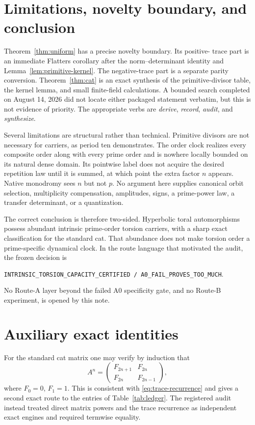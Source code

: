 \documentclass[11pt]{article}
\theoremstyle{definition}
\theoremstyle{remark}
\newcommand{\classification}{\texttt{INTRINSIC\_TORSION\_CAPACITY\_CERTIFIED / A0\_FAIL\_PROVES\_TOO\_MUCH}}
\begin{document}
\section{Limitations, novelty boundary, and conclusion}
\label{sec:conclusion}

Theorem~\ref{thm:uniform} has a precise novelty boundary.  Its positive-
trace part is an immediate Flatters corollary after the norm--determinant
identity and Lemma~\ref{lem:primitive-kernel}.  The negative-trace part is a
separate parity conversion.  Theorem~\ref{thm:cat} is an exact synthesis of
the primitive-divisor table, the kernel lemma, and small finite-field
calculations.  A bounded search completed on August 14, 2026 did not locate
either packaged statement verbatim, but this is not evidence of priority.
The appropriate verbs are \emph{derive}, \emph{record}, \emph{audit}, and
\emph{synthesize}.

Several limitations are structural rather than technical.  Primitive
divisors are not necessary for carriers, as period ten demonstrates.  The
order clock realizes every composite order along with every prime order and
is nowhere locally bounded on its natural dense domain.  Its pointwise label
does not acquire the desired repetition law until it is summed, at which
point the extra factor \(n\) appears.  Native monodromy sees \(n\) but not
\(p\).  No argument here supplies canonical orbit selection, multiplicity
compensation, amplitudes, signs, a prime-power law, a transfer determinant,
or a quantization.

The correct conclusion is therefore two-sided.  Hyperbolic toral
automorphisms possess abundant intrinsic prime-order torsion carriers, with
a sharp exact classification for the standard cat.  That abundance does not
make torsion order a prime-specific dynamical clock.  In the route language
that motivated the audit, the frozen decision is
\begin{center}
  \classification.
\end{center}
No Route-A layer beyond the failed A0 specificity gate, and no Route-B
experiment, is opened by this note.

\appendix

\section{Auxiliary exact identities}
\label{app:identities}

For the standard cat matrix one may verify by induction that
\begin{equation}
  A^n=\begin{pmatrix}
    F_{2n+1} & F_{2n}\\
    F_{2n}   & F_{2n-1}
  \end{pmatrix},
  \label{eq:fibonacci}
\end{equation}
where \(F_0=0\), \(F_1=1\).  This is consistent with
\eqref{eq:trace-recurrence} and gives a second exact route to the entries of
Table~\ref{tab:ledger}.  The registered audit instead treated direct matrix
powers and the trace recurrence as independent exact engines and required
termwise equality.
\end{document}
